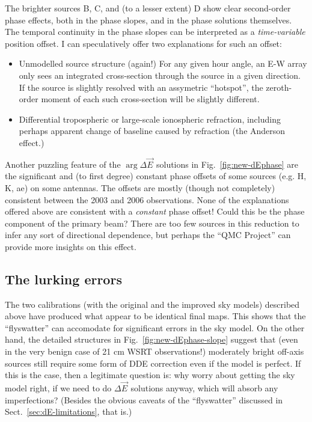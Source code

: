 \documentclass[]{aa}
\newcommand{\jones}[2]{\vec {#1}_{#2}}
\begin{document}
The brighter sources B, C, and (to a lesser extent) D show clear second-order phase effects, both in the phase slopes, and in the phase solutions themselves. The temporal continuity in the phase slopes can be interpreted as a \emph{time-variable} position offset. I can speculatively offer two explanations for such an offset:

\begin{itemize}
\item Unmodelled source structure (again!) For any given hour angle, an E-W array only sees an integrated cross-section through the source in a given direction. If the source is slightly resolved with an assymetric ``hotspot'', the zeroth-order moment of each such cross-section will be slightly different. 
\item Differential tropospheric or large-scale ionospheric refraction, including perhaps apparent change of baseline caused by refraction (the Anderson effect.)
\end{itemize}

Another puzzling feature of the $\arg\Delta\jones{E}{}$ solutions in Fig.~\ref{fig:new-dEphase}
are the significant and (to first degree) constant phase offsets of some sources (e.g. H, K, ae) on some antennas. The offsets are mostly (though not completely) consistent between the 2003 and 2006 observations. None of the explanations offered above are consistent with a \emph{constant} phase offset! Could this be the phase component of the primary beam? There are too few sources in this reduction to infer any sort of directional dependence, but perhaps the ``QMC Project'' can provide more insights on this effect.

\subsection{The lurking errors\label{sec:deep-errors}}

The two calibrations (with the original and the improved sky models) described above have produced what appear to be identical final maps. This shows that the ``flyswatter'' can accomodate for significant errors in the sky model. On the other hand, the detailed structures in Fig.~\ref{fig:new-dEphase-slope} suggest that (even in the very benign case of 21 cm WSRT observations!) moderately bright off-axis sources still require some form of DDE correction even if the model is perfect. If this is the case, then a legitimate question is: why worry about getting the sky model right, if we need to do $\Delta\jones{E}{}$ solutions anyway, which will absorb any imperfections? (Besides the obvious caveats of the ``flyswatter'' discussed in Sect.~\ref{sec:dE-limitations}, that is.)
\end{document}
